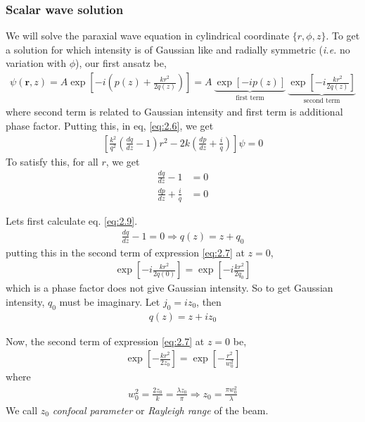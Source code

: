 \documentclass[11pt,a4paper]{article}
\numberwithin{equation}{section}
\begin{document}
\subsubsection{Scalar wave solution}
We will solve the paraxial wave equation in cylindrical coordinate $\{r,\phi,z \}$.\cite{cornell}
To get a solution for which intensity is of Gaussian like and radially symmetric (\textit{i.e.} no variation with $\phi$), our first ansatz be,\cite{kogelnik 66}\cite{cornell}
\begin{align}
	\psi(\boldsymbol{r},z)= A \exp\left[-i\left(p(z) + \frac{kr^2}{2q(z)}\right)\right]
	=A\:\underbrace{\exp\left[-ip(z)\right]}_{\text{first term}} \:\underbrace{\exp\left[-i\frac{kr^2}{2q(z)}\right]} _{\text{second term}} \label{eq:2.7}
\end{align} 
where second term is related to Gaussian intensity and first term is additional phase factor. Putting this, in eq, \ref{eq:2.6}, we get
\begin{align}
	\left[\frac{k^2}{q^2}\left(\frac{dq}{dz}-1\right)r^2 -2k\left(\frac{dp}{dz}+\frac{i}{q}\right)\right]\psi= 0
\end{align}
To satisfy this, for all $r$, we get
\begin{align}
	\frac{dq}{dz}-1 &=0 \label{eq:2.9}\\
	\frac{dp}{dz}+\frac{i}{q} &=0\label{eq:2.10}
\end{align}

Lets first calculate eq. \ref{eq:2.9}.
\begin{align}
	\frac{dq}{dz}-1 =0 
	\Rightarrow q(z) = z + q_0 \label{eq:2.11}
\end{align}
putting this in the second term of expression \ref{eq:2.7} at $z=0$,
\begin{align}
	\exp\left[-i\frac{kr^2}{2q(0)}\right] = \exp\left[-i\frac{kr^2}{2q_0}\right]
\end{align}
which is a phase factor does not give Gaussian intensity. So to get Gaussian intensity, $q_0$ must be imaginary. Let $j_0=iz_0$, then 
\begin{align}
	\boxed{q(z) = z + iz_0} \label{eq:2.13}
\end{align}

Now, the second term of expression \ref{eq:2.7} at $z=0$ be,
\begin{align}
	\exp\left[-\frac{kr^2}{2z_0}\right] = \exp\left[-\frac{r^2}{w_0^2}\right]
\end{align}
where
\begin{align}
	w_0^2=\frac{2z_0}{k}=\frac{\lambda z_0}{\pi}
	\Rightarrow \boxed{z_0 = \frac{\pi w_0^2}{\lambda} }
\end{align}
We call $z_0$ \textit{confocal parameter} or \textit{Rayleigh range} of the beam.
\end{document}
